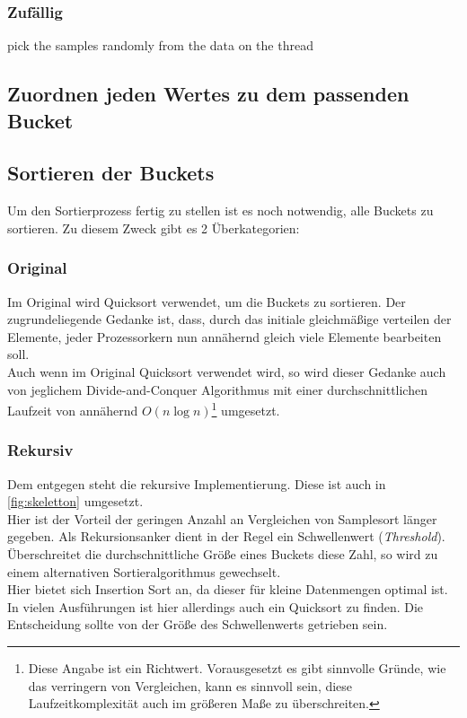 		\subsubsection{Zufällig}
			\label{sec:random}
			pick the samples randomly from the data on the thread

	\subsection{Zuordnen jeden Wertes zu dem passenden Bucket}
		

	\subsection{Sortieren der Buckets}
		Um den Sortierprozess fertig zu stellen ist es noch notwendig, alle Buckets zu sortieren.
		Zu diesem Zweck gibt es 2 Überkategorien:
		\subsubsection{Original}
			Im Original \autocite{frazer-1970} wird Quicksort verwendet, um die Buckets zu sortieren.
			Der zugrundeliegende Gedanke ist, dass, durch das initiale gleichmäßige verteilen der Elemente, jeder Prozessorkern nun annähernd gleich viele Elemente bearbeiten soll.\\
			Auch wenn im Original Quicksort verwendet wird, so wird dieser Gedanke auch von jeglichem Divide-and-Conquer Algorithmus mit einer durchschnittlichen Laufzeit von annähernd $O(n\log{n})$\footnote{Diese Angabe ist ein Richtwert. Vorausgesetzt es gibt sinnvolle Gründe, wie das verringern von Vergleichen, kann es sinnvoll sein, diese Laufzeitkomplexität auch im größeren Maße zu überschreiten.} umgesetzt. 
		\subsubsection{Rekursiv}
			Dem entgegen steht die rekursive Implementierung.
			Diese ist auch in \ref{fig:skeletton} umgesetzt.\\
			Hier ist der Vorteil der geringen Anzahl an Vergleichen von Samplesort länger gegeben. Als Rekursionsanker dient in der Regel ein Schwellenwert (\textit{Threshold}).
			Überschreitet die durchschnittliche Größe eines Buckets diese Zahl, so wird zu einem alternativen Sortieralgorithmus gewechselt. \\
			Hier bietet sich Insertion Sort an, da dieser für kleine Datenmengen optimal ist. \autocite{geeksforgeeks-2021} 
			In vielen Ausführungen ist hier allerdings auch ein Quicksort zu finden.
			Die Entscheidung sollte von der Größe des Schwellenwerts getrieben sein.
			
